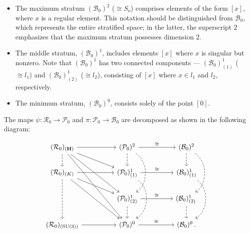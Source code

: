 \documentclass[12pt]{amsart}
\theoremstyle{definition}
\numberwithin{equation}{section}
\newcommand{\SU}{\mathrm{SU}}
\newcommand{\Cartan}{\mathbf{H}}
\newcommand{\Rxizero}{\mathcal{R}_{0}}
\newcommand{\Pxizero}{\mathcal{P}_{0}}
\newcommand{\Bxizero}{\mathcal{B}_{0}}
\begin{document}
\begin{itemize}
	\item[(1)] The maximum stratum   $(\Bxizero)^2$ ($\cong S_o$)  comprises elements of the form $[x]$, where $x$ is a regular element. This notation should be distinguished from $\Bxizero $, which represents the entire stratified space; in the latter, the superscript $2$ emphasizes that the maximum stratum possesses dimension $2$.  
	

	\item[(2)] The middle stratum, $(\Bxizero)^1  $,   includes elements $[x]$ where $x$ is singular but nonzero. Note that $(\Bxizero)^1  $ has two connected components --- $(\Bxizero)^1_{(1)}  $ ($\cong {l_1}$) and $(\Bxizero)^1_{(2)}  $ ($\cong {l_2}$),   consisting of $[x]$ where $x\in {l_1}$  and   $ {l_2}$, respectively.
	
	\item[(3)] The minimum stratum, $(\Bxizero)^0   $,    consists solely of the point $[0]$.
\end{itemize}

 The maps $\psi: \Rxizero  \to \Pxizero $ and $\pi: \Pxizero  \to \Bxizero $ are decomposed as shown in the following diagram:

\begin{equation}
	\label{Diagram:SU3arrows000NEW}
	\begin{tikzcd}
		(\Rxizero)_{(\Cartan)}\arrow[rrddd] \arrow[d,dashed] \arrow[rrd] \arrow[rrdd] \arrow[rr] && (\Pxizero)^2    \arrow[dd,bend left=55,dashed]\arrow[d,dashed]  \arrow[rr,"\cong" ]   && (\Bxizero)^2  \arrow[d,dashed] \arrow[dd,bend left=55,dashed] \\
		(\Rxizero)_{(K)} \arrow[rrdd] \arrow[dd,dashed]  \arrow[rrd]\arrow[rr ] && (\Pxizero)^1_{(1)}    \arrow[dd,bend left=55,dashed] \arrow[rr,"\cong" ]  && (\Bxizero)^1_{(1)}   \arrow[dd,bend left=55,dashed]\\  ~
		&& (\Pxizero)^1_{(2)}    \arrow[d,dashed] \arrow[rr,"\cong"] && (\Bxizero)^1_{(2)}  \,\arrow[d,dashed] \\
(\Rxizero)_{(\SU(3))}  \arrow[rr]
		&& (\Pxizero)^0    \arrow[rr,"\cong"] && (\Bxizero)^0   \,.
	\end{tikzcd}
\end{equation}


\end{document}

